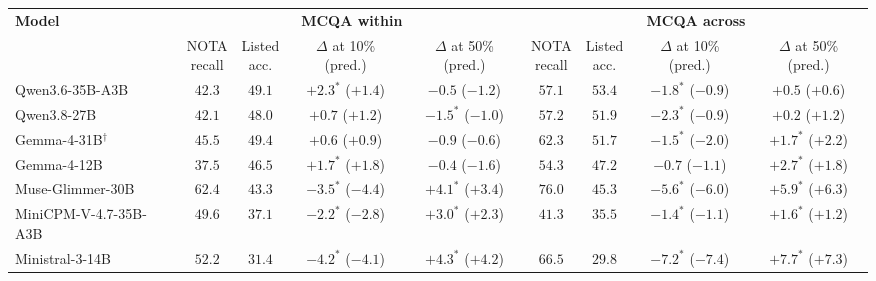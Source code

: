 \setlength{\tabcolsep}{4pt}
\begin{tabular}{lcccccccc}
\toprule
\multirow{2}{*}{\textbf{Model}} & \multicolumn{4}{c}{\textbf{MCQA within}} & \multicolumn{4}{c}{\textbf{MCQA across}} \\
\cmidrule(lr){2-5} \cmidrule(lr){6-9}
 & \makecell{NOTA\\recall} & \makecell{Listed\\acc.} & \makecell{$\Delta$ at 10\%\\(pred.)} & \makecell{$\Delta$ at 50\%\\(pred.)} & \makecell{NOTA\\recall} & \makecell{Listed\\acc.} & \makecell{$\Delta$ at 10\%\\(pred.)} & \makecell{$\Delta$ at 50\%\\(pred.)} \\
\midrule
Qwen3.6-35B-A3B & $42.3$ & $49.1$ & $+2.3^{*}$ ($+1.4$) & $-0.5$ ($-1.2$) & $57.1$ & $53.4$ & $-1.8^{*}$ ($-0.9$) & $+0.5$ ($+0.6$) \\
Qwen3.8-27B & $42.1$ & $48.0$ & $+0.7$ ($+1.2$) & $-1.5^{*}$ ($-1.0$) & $57.2$ & $51.9$ & $-2.3^{*}$ ($-0.9$) & $+0.2$ ($+1.2$) \\
Gemma-4-31B$^\dagger$ & $45.5$ & $49.4$ & $+0.6$ ($+0.9$) & $-0.9$ ($-0.6$) & $62.3$ & $51.7$ & $-1.5^{*}$ ($-2.0$) & $+1.7^{*}$ ($+2.2$) \\
Gemma-4-12B & $37.5$ & $46.5$ & $+1.7^{*}$ ($+1.8$) & $-0.4$ ($-1.6$) & $54.3$ & $47.2$ & $-0.7$ ($-1.1$) & $+2.7^{*}$ ($+1.8$) \\
Muse-Glimmer-30B & $62.4$ & $43.3$ & $-3.5^{*}$ ($-4.4$) & $+4.1^{*}$ ($+3.4$) & $76.0$ & $45.3$ & $-5.6^{*}$ ($-6.0$) & $+5.9^{*}$ ($+6.3$) \\
MiniCPM-V-4.7-35B-A3B & $49.6$ & $37.1$ & $-2.2^{*}$ ($-2.8$) & $+3.0^{*}$ ($+2.3$) & $41.3$ & $35.5$ & $-1.4^{*}$ ($-1.1$) & $+1.6^{*}$ ($+1.2$) \\
Ministral-3-14B & $52.2$ & $31.4$ & $-4.2^{*}$ ($-4.1$) & $+4.3^{*}$ ($+4.2$) & $66.5$ & $29.8$ & $-7.2^{*}$ ($-7.4$) & $+7.7^{*}$ ($+7.3$) \\
\bottomrule
\end{tabular}
